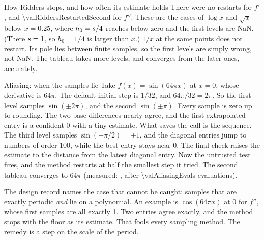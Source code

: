 \begin{sidebar}[label=sb:floor-coverage]{How Ridders stops, and how often its estimate holds}
There were no restarts for $f'$, and \num{\valRiddersRestartedSecond} for $f''$. These are the cases of $\log x$ and
$\sqrt{x}$ below $x = 0.25$, where $h_0 = s / 4$ reaches below zero and the first levels are NaN. (There
$s = 1$, so $h_0 = 1/4$ is larger than $x$.) $1/x$ at the same points does not restart. Its pole lies between
finite samples, so the first levels are simply wrong, not NaN. The tableau takes more levels, and converges from
the later ones, accurately.
\end{sidebar}

%
\begin{sidebar}[label=sb:aliasing]{Aliasing: when the samples lie}
Take $f(x) = \sin(64 \pi x)$ at $x = 0$, whose derivative is $64\pi$. The default initial step is $1/32$, and
$64 \pi / 32 = 2\pi$. So the first level samples $\sin(\pm 2\pi)$, and the second $\sin(\pm \pi)$. Every sample is
zero up to rounding. The two base differences nearly agree, and the first extrapolated entry is a confident 0 with
a tiny estimate. What saves the call is the sequence. The third level samples $\sin(\pm \pi / 2) = \pm 1$, and the
diagonal entries jump to numbers of order 100, while the best entry stays near 0. The final check raises the
estimate to the distance from the latest diagonal entry. Now the untrusted test fires, and the method restarts at
half the smallest step it tried. The second tableau converges to $64\pi$ (measured: \valAliasingResult{}, after
\num{\valAliasingEvals} evaluations).

The design record names the case that cannot be caught: samples that are exactly periodic \emph{and} lie on a
polynomial. An example is $\cos(64 \pi x)$ at 0 for $f''$, whose first samples are all exactly 1. Two entries agree
exactly, and the method stops with the floor as its estimate. That fools every sampling method. The remedy is a step
on the scale of the period.
\end{sidebar}
